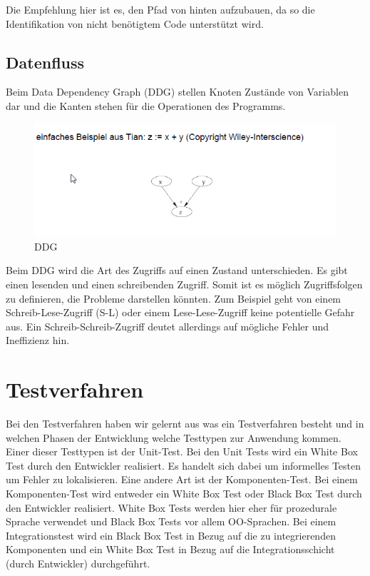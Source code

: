 Die Empfehlung hier ist es, den Pfad von hinten aufzubauen, da so die Identifikation von nicht benötigtem Code unterstützt wird.

\subsection{Datenfluss}
Beim Data Dependency Graph (DDG) stellen Knoten Zustände von Variablen dar und die Kanten stehen für die Operationen des Programms. 
\begin{figure}[hbtp]
\centering
\includegraphics[scale=0.8]{document/graphics/DDG} 
\caption{DDG}
\end{figure}

Beim DDG wird die Art des Zugriffs auf einen Zustand unterschieden. Es gibt einen lesenden und einen schreibenden Zugriff. Somit ist es möglich Zugriffsfolgen zu definieren, die Probleme darstellen könnten. Zum Beispiel geht von einem Schreib-Lese-Zugriff (S-L) oder einem Lese-Lese-Zugriff keine potentielle Gefahr aus. Ein Schreib-Schreib-Zugriff deutet allerdings auf mögliche Fehler und Ineffizienz hin. 

\section{Testverfahren}
Bei den Testverfahren haben wir gelernt aus was ein Testverfahren besteht und in welchen Phasen der Entwicklung welche Testtypen zur Anwendung kommen.
Einer dieser Testtypen ist der Unit-Test.
Bei den Unit Tests wird ein White Box Test durch den Entwickler realisiert. Es handelt sich dabei um informelles Testen um Fehler zu lokalisieren. 
Eine andere Art ist der Komponenten-Test.
Bei einem Komponenten-Test wird entweder ein White Box Test oder Black Box Test durch den Entwickler realisiert. White Box Tests werden hier eher für prozedurale Sprache verwendet und Black Box Tests vor allem OO-Sprachen.
Bei einem Integrationstest wird ein Black Box Test in Bezug auf die zu integrierenden Komponenten und ein White Box Test in Bezug auf die Integrationsschicht (durch Entwickler) durchgeführt. 

